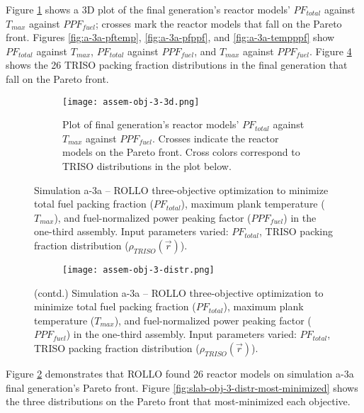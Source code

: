 Figure \ref{fig:assem-obj-3-3d} shows a 3D plot of the final generation's reactor models' 
$PF_{total}$ against $T_{max}$ against $PPF_{fuel}$; crosses mark the reactor models 
that fall on the Pareto front.
Figures \ref{fig:a-3a-pftemp}, \ref{fig:a-3a-pfppf}, and \ref{fig:a-3a-tempppf} show 
$PF_{total}$ against $T_{max}$, $PF_{total}$ against $PPF_{fuel}$, and 
$T_{max}$ against $PPF_{fuel}$. 
Figure \ref{fig:assem-obj-3-distr} shows the 26 TRISO packing fraction distributions in 
the final generation that fall on the Pareto front. 
\begin{figure}[htbp!]
    \begin{subfigure}{\textwidth}
        \centering
        \texttt{[image: assem-obj-3-3d.png]}
        \caption{Plot of final generation's reactor models' $PF_{total}$ against 
        $T_{max}$ against $PPF_{fuel}$. Crosses indicate the reactor models on the 
        Pareto front. Cross colors correspond to TRISO distributions in the plot below.}
        \label{fig:assem-obj-3-3d} 
    \end{subfigure}
    \caption{Simulation a-3a -- ROLLO three-objective optimization to minimize total 
    fuel packing fraction ($PF_{total}$), maximum plank temperature ($T_{max}$), and 
    fuel-normalized power peaking factor ($PPF_{fuel}$) in the one-third assembly. 
    Input parameters varied: $PF_{total}$, TRISO packing fraction distribution
    ($\rho_{TRISO}(\vec{r})$).}
    \label{fig:assem-obj-3}
\end{figure}
\begin{figure}[htbp!]
    \ContinuedFloat
    \begin{subfigure}{\textwidth}
        \centering
        \texttt{[image: assem-obj-3-distr.png]}
        \caption{}
        \label{fig:assem-obj-3-distr} 
    \end{subfigure}
    \caption{(contd.) Simulation a-3a -- ROLLO three-objective optimization to minimize 
    total fuel packing fraction ($PF_{total}$), maximum plank temperature ($T_{max}$),
    and fuel-normalized power peaking factor ($PPF_{fuel}$) in the one-third assembly. 
    Input parameters varied: $PF_{total}$, TRISO packing fraction distribution
    ($\rho_{TRISO}(\vec{r})$).}
\end{figure}

Figure \ref{fig:assem-obj-3} demonstrates that \gls{ROLLO} found 26 reactor models on 
simulation a-3a final generation's Pareto front. 
Figure \ref{fig:slab-obj-3-distr-most-minimized} shows the three distributions on the 
Pareto front that most-minimized each objective. 


